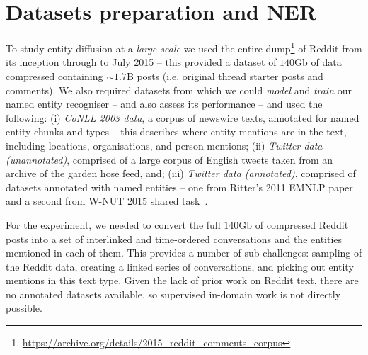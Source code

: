 \documentclass[acmsmall]{acmart}
\begin{document}
\section{Datasets preparation and NER}
\label{sec:datasets_ner} 
To study entity diffusion at a \emph{large-scale} we used the entire dump\footnote{\url{https://archive.org/details/2015_reddit_comments_corpus}} of Reddit from its inception through to July 2015 -- this provided a dataset of $140$Gb of data compressed containing $\sim1.7$B posts (i.e. original thread starter posts and comments).
We also required datasets from which we could \emph{model} and \emph{train} our named entity recogniser -- and also assess its performance -- and used the following:
(i) \emph{CoNLL 2003 data}, a corpus of newswire texts, annotated for named entity chunks and types -- this describes where entity mentions are in the text, including locations, organisations, and person mentions; 
(ii) \emph{Twitter data (unannotated)}, comprised of a large corpus of English tweets taken from an archive of the garden hose feed, and; 
(iii) \emph{Twitter data (annotated)}, comprised of datasets annotated with named entities -- one from Ritter's 2011 EMNLP paper~\cite{ritter2011named} and a second from W-NUT 2015 shared task~\cite{baldwin2015shared}.

For the experiment, we needed to convert the full $140$Gb of compressed Reddit posts into a set of interlinked and time-ordered conversations and the entities mentioned in each of them.
This provides a number of sub-challenges: sampling of the Reddit data, creating a linked series of conversations, and picking out entity mentions in this text type.
Given the lack of prior work on Reddit text, there are no annotated datasets available, so supervised in-domain work is not directly possible.
\end{document}
